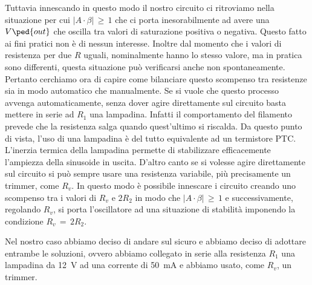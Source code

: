Tuttavia innescando in questo modo il nostro circuito ci ritroviamo nella situazione per cui $\left|A \cdot \beta \right|\, \geq \,1$ che ci porta inesorabilmente ad avere una $V\ped{out}$ che oscilla tra valori di saturazione positiva o negativa. Questo fatto ai fini pratici non è di nessun interesse. Inoltre dal momento che i valori di resistenza per due $R$ uguali, nominalmente hanno lo stesso valore, ma in pratica sono differenti, questa situazione può verificarsi anche non spontaneamente.
Pertanto cerchiamo ora di capire come bilanciare questo scompenso tra resistenze sia in modo automatico che manualmente. Se si vuole che questo processo avvenga automaticamente, senza dover agire direttamente sul circuito basta mettere in serie ad $R_1$ una lampadina. Infatti il comportamento del filamento prevede che la resistenza salga quando quest'ultimo si riscalda. Da questo punto di vista, l'uso di una lampadina è del tutto equivalente ad un termistore PTC. L'inerzia termica della lampadina permette di stabilizzare efficacemente l'ampiezza della sinusoide in uscita.
D'altro canto se si volesse agire direttamente sul circuito si può sempre usare una resistenza variabile, più precisamente un trimmer, come $R_v$. In questo modo è possibile innescare i circuito creando uno scompenso tra i valori di $R_v$ e $2R_2$ in modo che $\left|A \cdot \beta \right|\, \geq \,1$ e successivamente, regolando $R_v$, si porta l'oscillatore ad una situazione di stabilità imponendo la condizione $R_v\,=\,2R_2$.

Nel nostro caso abbiamo deciso di andare sul sicuro e abbiamo deciso di adottare entrambe le soluzioni, ovvero abbiamo collegato in serie alla resistenza $R_1$ una lampadina da \SI{12}{\volt} ad una corrente di \SI{50}{\milli\ampere} e abbiamo usato, come $R_v$, un trimmer.


















